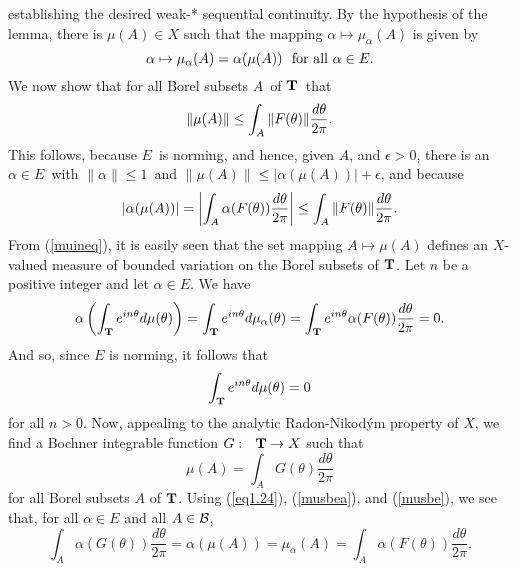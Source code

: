 establishing the desired weak-* sequential continuity.  
By the hypothesis of the lemma, there 
is $\mu (A)\in X$ such that the mapping
$\alpha\mapsto \mu_\alpha(A)$ is given by    
\begin{equation}
\alpha\mapsto \mu_\alpha(A)=\alpha(\mu(A))\ \ {\rm for\ all}\ \alpha\in E.
\label{musbea}
\end{equation}
We now show that for all Borel subsets $A$\ of $\T$\ that
\begin{equation}
\label{muineq}
\|\mu(A)\| \le \int_A \| F(\theta)\| {d\theta\over2\pi} .
\end{equation}
This follows, because $E$\ is norming, and hence, given $A$, and $\epsilon>0$, 
there is an $\alpha\in E$\ with
$\|\alpha\| \le 1$\ and $\|\mu(A)\| \leq |\alpha(\mu(A))| + \epsilon$, and
because
$$ |\alpha(\mu(A))| = \left|\int_A \alpha(F(\theta)) {d\theta\over 2\pi}\right|
   \le \int_A \| F(\theta)\| {d\theta\over2\pi} .$$
From (\ref{muineq}), it is easily seen that the set mapping $A\mapsto \mu(A)$ 
defines an $X$-valued measure of bounded variation on 
the Borel subsets of $\T$.  Let $n$ 
be a positive integer and let $\alpha\in E$.  We have
$$
\alpha\left(\int_\T e^{in\theta}d\mu(\theta)
\right)                 =     \int_\T e^{in\theta} d\mu_\alpha(\theta)
			=     \int_\T e^{in\theta} 
				\alpha(F(\theta))\frac{d\theta}{2 \pi}
			=     0.
$$
And so, since $E$ is norming, it follows that 
$$\int_\T e^{in\theta}d\mu(\theta)=0 $$
for all $n>0$.  Now, appealing to the analytic 
Radon-Nikod\'ym property of $X$, we find a 
Bochner integrable function $G:\ \ \T\rightarrow X$ such that
\begin{equation}
\mu(A)=\int_A G(\theta)\frac{d\theta}{2 \pi}
\label{eq1.24}
\end{equation}
for all Borel subsets $A$ of $\T$.  
Using (\ref{eq1.24}), (\ref{musbea}), and (\ref{musbe}), 
we see that, for all $\alpha\in E$ and all $A\in {\cal B}$,
$$
\int_A \alpha(G(\theta))\frac{d\theta}{2 \pi}        =     \alpha(\mu(A))       
						=     \mu_\alpha(A)        
			=     \int_A \alpha(F(\theta))\frac{d\theta}{2 \pi}.
$$
